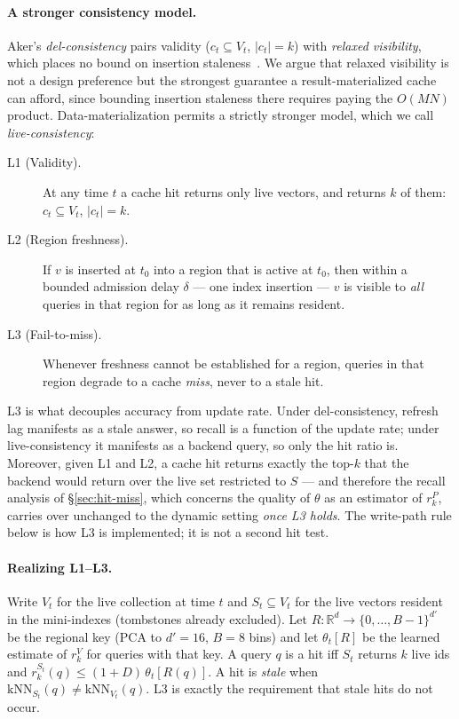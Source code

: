 \paragraph{A stronger consistency model.}
Aker's \emph{del-consistency} pairs validity ($c_t \subseteq V_t$,
$|c_t| = k$) with \emph{relaxed visibility}, which places no bound on
insertion staleness~\cite{aker}. We argue that relaxed visibility is not
a design preference but the strongest guarantee a result-materialized
cache can afford, since bounding insertion staleness there requires
paying the $O(MN)$ product. Data-materialization permits a strictly
stronger model, which we call \emph{live-consistency}:

\begin{description}
  \item[L1 (Validity).] At any time $t$ a cache hit returns only live
    vectors, and returns $k$ of them: $c_t \subseteq V_t$,
    $|c_t| = k$.
  \item[L2 (Region freshness).] If $v$ is inserted at $t_0$ into a
    region that is active at $t_0$, then within a bounded admission
    delay $\delta$ --- one index insertion --- $v$ is visible to
    \emph{all} queries in that region for as long as it remains
    resident.
  \item[L3 (Fail-to-miss).] Whenever freshness cannot be established
    for a region, queries in that region degrade to a cache
    \emph{miss}, never to a stale hit.
\end{description}

L3 is what decouples accuracy from update rate. Under
del-consistency, refresh lag manifests as a stale answer, so recall is a
function of the update rate; under live-consistency it manifests as a
backend query, so only the hit ratio is. Moreover, given L1 and L2, a
cache hit returns exactly the top-$k$ that the backend would return over
the live set restricted to $S$ --- and therefore the recall analysis of
\S\ref{sec:hit-miss}, which concerns the quality of $\theta$ as an
estimator of $r^P_k$, carries over unchanged to the dynamic setting
\emph{once L3 holds}. The write-path rule below is how L3 is
implemented; it is not a second hit test.

\paragraph{Realizing L1--L3.}
Write $V_t$ for the live collection at time $t$ and
$S_t\subseteq V_t$ for the live vectors resident in the mini-indexes
(tombstones already excluded). Let \(R:\mathbb{R}^d\to\{0,\ldots,B{-}1\}^{d'}\)
be the regional key (PCA to \(d'{=}16\), \(B{=}8\) bins) and let
\(\theta_t[R]\) be the learned estimate of \(r^{V}_k\) for queries with
that key. A query \(q\) is a hit iff \(S_t\) returns \(k\) live ids and
\(r^{S_t}_k(q)\le(1{+}D)\,\theta_t[R(q)]\). A hit is
\emph{stale} when
\(\mathrm{kNN}_{S_t}(q)\ne\mathrm{kNN}_{V_t}(q)\). L3 is exactly the
requirement that stale hits do not occur.

